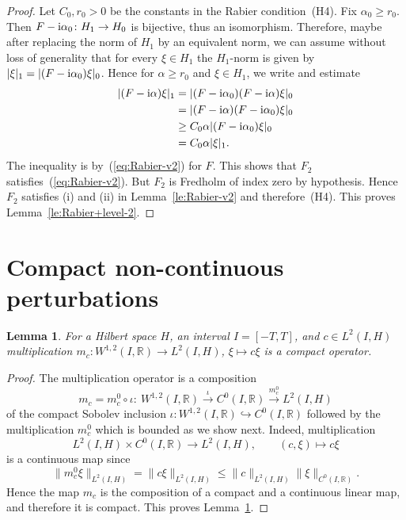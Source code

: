\documentclass[pdftex]{sigma}
\numberwithin{equation}{section}
\newtheorem{Lemma}[Theorem]{Lemma}
\newcommand{\R}{{\mathbb{R}}}
\newcommand{\norm}{{\rm norm}}
\def\abs#1{\mathopen|#1\mathclose|}
\def\norm#1{\mathopen\|#1\mathclose\|}
\newcommand{\INTO}{\hookrightarrow} %
\newcommand{\1}{{{\mathchoice {\rm 1\mskip-4mu l} {\rm 1\mskip-4mu l}
{\rm 1\mskip-4.5mu l} {\rm 1\mskip-5mu l}}}}
\begin{document}
\begin{proof}
Let $C_0,r_0>0$ be the constants in the Rabier condition~(H4).
Fix $\alpha_0\ge r_0$.
Then $F-{\rm i}\alpha_0\colon H_1\to H_0$ is bijective, thus an isomorphism.
Therefore, maybe after replacing the norm of $H_1$ by an equivalent
norm, we can assume without loss of generality
that for every $\xi\in H_1$ the $H_1$-norm is given by
$\abs{\xi}_1 =\abs{(F-{\rm i}\alpha_0)\xi}_0$.
Hence for $\alpha\ge r_0$ and $\xi\in H_1$, we write and estimate
\begin{equation*}
\begin{split}
 \abs{(F-{\rm i}\alpha)\xi}_1
 &=\abs{(F-{\rm i}\alpha_0) (F-{\rm i}\alpha)\xi}_0\\
 &=\abs{(F-{\rm i}\alpha) (F-{\rm i}\alpha_0)\xi}_0\\
 &\ge C_0\alpha \abs{(F-{\rm i}\alpha_0)\xi}_0\\
 &= C_0\alpha \abs{\xi}_1 .
\end{split}
\end{equation*}
The inequality is by~(\ref{eq:Rabier-v2}) for $F$.
This shows that $F_2$ satisfies~(\ref{eq:Rabier-v2}).
But $F_2$ is Fredholm of index zero by hypothesis.
Hence $F_2$ satisfies (i) and (ii) in
Lemma~\ref{le:Rabier-v2} and therefore~(H4).
This proves Lemma~\ref{le:Rabier+level-2}.
\end{proof}



\section{Compact non-continuous perturbations}

\begin{Lemma}\label{le:bhgb777}
For a Hilbert space $H$,
an interval $I=[-T,T]$, and $c\in L^2(I,H)$
multiplication $m_c\colon W^{1,2}(I,\R)\to L^2(I,H)$,
$\xi\mapsto c\xi$ is a compact operator.
\end{Lemma}

\begin{proof}
The multiplication operator is a composition
\[
 m_c=m_c^0\circ \iota\colon\
 W^{1,2}(I,\R)
 \stackrel{\iota}{\longrightarrow} C^0(I,\R)
 \stackrel{m_c^0}{\longrightarrow} L^2(I,H)
\]
of the compact Sobolev inclusion $\iota\colon W^{1,2}(I,\R)\INTO C^0(I,\R)$
followed by the multiplication $m_c^0$
which is bounded as we show next.
%
Indeed, multiplication
\[
 L^2(I,H)\times C^0(I,\R)\to L^2(I,H)
 ,\qquad
 (c,\xi)\mapsto c\xi
\]
is a continuous map since
\[
 \bigl\|m_c^0\xi\bigr\|_{L^2(I,H)}
 =\norm{c\xi}_{L^2(I,H)}
 \le \norm{c}_{L^2(I,H)}\norm{\xi}_{C^0(I,\R)} .
\]
Hence the map $m_c$
is the composition of a compact and a continuous
linear map, and therefore it is compact.
This proves Lemma~\ref{le:bhgb777}.
\end{proof}
\end{document}
